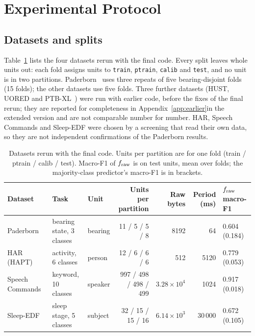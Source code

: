 \section{Experimental Protocol}
\label{sec:protocol}

\subsection{Datasets and splits}

Table~\ref{tab:datasets} lists the four datasets rerun with the final code. Every split leaves
whole units out: each fold assigns units to \texttt{train}, \texttt{ptrain}, \texttt{calib} and
\texttt{test}, and no unit is in two partitions. Paderborn~\cite{lessmeier2016paderborn} uses three
repeats of five bearing-disjoint folds (15 folds); the other datasets use five folds. Three further
datasets (HUST, UORED and PTB-XL~\cite{wagner2020ptbxl}) were run with earlier code, before the
fixes of the final rerun; they are reported for completeness
\ifarxiv in Appendix~\ref{app:earlier}\else in the extended version\fi{} and are not comparable
number for number. HAR, Speech Commands and Sleep-EDF were chosen by a screening that read their
own data, so they are not independent confirmations of the Paderborn results.

\begin{table}[t]
\centering
\caption{Datasets rerun with the final code. Units per partition are for one fold
(train / ptrain / calib / test). Macro-F1 of $f_{\mathrm{raw}}$ is on test units, mean over folds; the
majority-class predictor's macro-F1 is in brackets.}
\label{tab:datasets}
\begin{tabular}{lllrrrl}
\toprule
Dataset & Task & Unit & Units per partition & Raw bytes & Period (ms) & $f_{\mathrm{raw}}$ macro-F1 \\
\midrule
Paderborn~\cite{lessmeier2016paderborn} & bearing state, 3 classes & bearing & 11 / 5 / 5 / 8 & 8192 & 64 & 0.604 (0.184) \\
HAR (HAPT)~\cite{reyesortiz2016hapt} & activity, 6 classes & person & 12 / 6 / 6 / 6 & 512 & 5120 & 0.779 (0.053) \\
Speech Commands~\cite{warden2018speech} & keyword, 10 classes & speaker & 997 / 498 / 498 / 499 & $3.28\times10^4$ & 1024 & 0.917 (0.018) \\
Sleep-EDF~\cite{kemp2000sleepedf} & sleep stage, 5 classes & subject & 32 / 15 / 15 / 16 & $6.14\times10^3$ & 30\,000 & 0.672 (0.105) \\
\bottomrule
\end{tabular}
\end{table}

